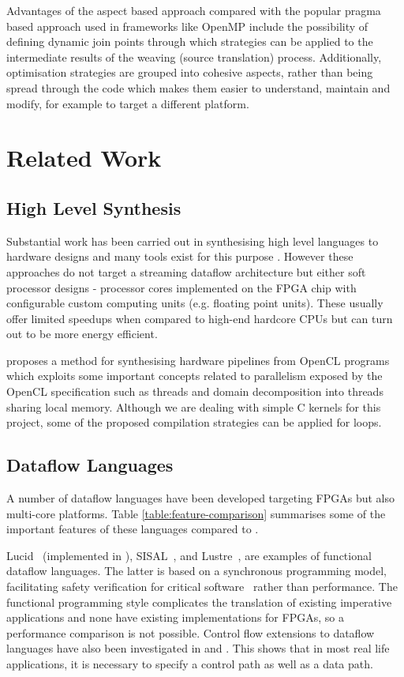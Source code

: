 Advantages of the aspect based approach compared with the popular
pragma based approach used in frameworks like
OpenMP \cite{Ferrer:Judit:Bellens:Duran:Gonzalez:Marorell:Badia:Ayquade:Labarta:2011}
include the possibility of defining dynamic join points through which
strategies can be applied to the intermediate results of the weaving
(source translation) process. Additionally, optimisation strategies are
grouped into cohesive aspects, rather than being spread through the
code which makes them easier to understand, maintain and modify, for
example to target a different platform.


\section{Related Work}

\subsection{High Level Synthesis}

Substantial work has been carried out in synthesising high level
languages to hardware designs and many tools exist for this purpose
\cite{CtoVerilog, Vivado, ImpulseC}. However these approaches
do not target a streaming dataflow architecture but either soft
processor designs - processor cores implemented on the FPGA chip with
configurable custom computing units (e.g. floating point units). These
usually offer limited speedups when compared to high-end hardcore
CPUs but can turn out to be more energy efficient.

\cite{Czerniawski} proposes a method for synthesising hardware
pipelines from OpenCL programs which exploits some important concepts
related to parallelism exposed by the OpenCL specification
\cite{OpenCL} such as threads and domain decomposition into threads
sharing local memory. Although we are dealing with simple C kernels
for this project, some of the proposed compilation strategies can be
applied for loops.

\subsection{Dataflow Languages}
A number of dataflow languages have been developed targeting FPGAs but
also multi-core platforms. Table \ref{table:feature-comparison}
summarises some of the important features of these languages compared
to \FAST{}.

Lucid~\cite{ashcroft1977lucid} (implemented in \cite{pLucid}),
SISAL~\cite{gurd1987implicit,mcgraw1983sisal}, and
Lustre~\cite{halbwachs1991synchronous}, are examples of functional
dataflow languages. The latter is based on a synchronous programming
model, facilitating safety verification for critical
software~\cite{halbwachs1992programming} rather than performance. The
functional programming style complicates the translation of existing
imperative applications and none have existing implementations for
FPGAs, so a performance comparison is not possible. Control flow
extensions to dataflow languages have also been investigated in
\cite{143862} and \cite{183202}. This shows that in most real life
applications, it is necessary to specify a control path as well as a
data path.


